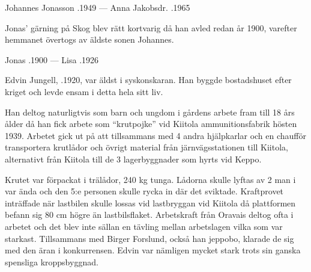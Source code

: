 Johannes Jonasson .1949   ---   Anna Jakobsdr. .1965


Jonas' gärning på Skog blev rätt kortvarig då han avled redan år 1900, varefter hemmanet övertogs av äldste sonen Johannes.

\begin{jhchildren}
  \item {}
  \item {}
  \item {}
  \item {}
  \item {}
  \item {}
  \item {}
\end{jhchildren}

Jonas .1900  ---   Lisa .1926






Edvin Jungell, .1920, var äldst i syskonskaran. Han byggde bostadshuset efter kriget och levde ensam i detta hela sitt liv.

Han deltog naturligtvis som barn och ungdom i gårdens arbete fram till 18 års ålder då han fick arbete som ``krutpojke'' vid Kiitola ammunitionsfabrik hösten 1939. Arbetet gick ut på att tillsammans med 4 andra hjälpkarlar och en chaufför transportera krutlådor och övrigt material från järnvägsstationen till Kiitola, alternativt från Kiitola till de 3 lagerbyggnader som hyrts vid Keppo.

Krutet var förpackat i trälådor, 240 kg tunga. Lådorna skulle lyftas av 2 man i var ända och den 5:e personen skulle rycka in där det sviktade. Kraftprovet inträffade när lastbilen skulle lossas vid lastbryggan vid Kiitola då plattformen befann sig 80 cm högre än lastbilsflaket. Arbetskraft från Oravais deltog ofta i arbetet och det blev inte sällan en tävling mellan arbetslagen vilka som var starkast. Tillsammans med Birger Forslund, också han jeppobo, klarade de sig med den äran i konkurrensen. Edvin var nämligen mycket stark trots sin ganska spensliga kroppsbyggnad.

